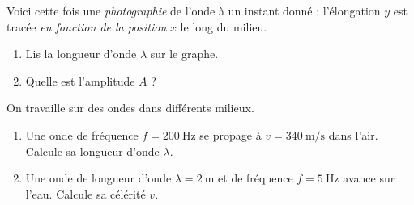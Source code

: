 \documentclass[11pt,a4paper]{article}
\begin{document}
\begin{exo}
Voici cette fois une \emph{photographie} de l'onde à un instant donné : l'élongation $y$
est tracée \emph{en fonction de la position} $x$ le long du milieu.
\begin{center}
\end{center}
\begin{enumerate}[label=\alph*)]
  \item Lis la longueur d'onde $\lambda$ sur le graphe.
  \item Quelle est l'amplitude $A$ ?
\end{enumerate}
\end{exo}

\begin{exo}
On travaille sur des ondes dans différents milieux.
\begin{enumerate}[label=\alph*)]
  \item Une onde de fréquence $f=\SI{200}{\hertz}$ se propage à $v=\SI{340}{\metre\per\second}$
        dans l'air. Calcule sa longueur d'onde $\lambda$.
  \item Une onde de longueur d'onde $\lambda=\SI{2}{\metre}$ et de fréquence $f=\SI{5}{\hertz}$
        avance sur l'eau. Calcule sa célérité $v$.
\end{enumerate}
\end{exo}
\end{document}
